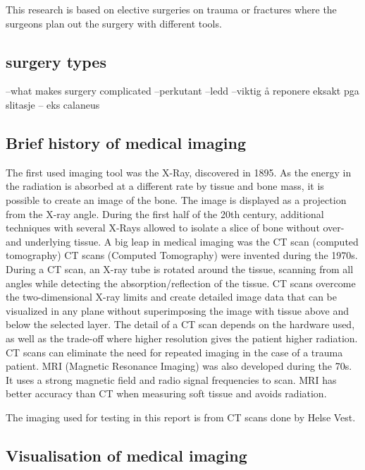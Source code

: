 \documentclass[a4paper]{report}
\begin{document}
This research is based on elective surgeries on trauma or fractures where the surgeons plan out the surgery with different tools.

\subsection{surgery types}
--what makes surgery complicated
--perkutant
--ledd
--viktig å reponere eksakt pga slitasje
-- eks calaneus

\subsection{Brief history of medical imaging}
The first used imaging tool was the X-Ray, discovered in 1895\cite{hamblen_outline_2010}\cite{suetens_fundamentals_2017}. As the energy in the radiation is absorbed at a different rate by tissue and bone mass, it is possible to create an image of the bone. The image is displayed as a projection from the X-ray angle. During the first half of the 20th century, additional techniques with several X-Rays allowed to isolate a slice of bone without over- and underlying tissue. A big leap in medical imaging was the CT scan (computed tomography)\cite{bradley_history_2008}
CT scans (Computed Tomography) were invented during the 1970s. During a CT scan, an X-ray tube is rotated around the tissue, scanning from all angles while detecting the absorption/reflection of the tissue. CT scans overcome the two-dimensional X-ray limits and create detailed image data that can be visualized in any plane without superimposing the image with tissue above and below the selected layer\cite{hamblen_outline_2010}. The detail of a CT scan depends on the hardware used, as well as the trade-off where higher resolution gives the patient higher radiation\cite{bradley_history_2008}. CT scans can eliminate the need for repeated imaging in the case of a trauma patient\cite{swiontkowski_manual_2013}.
MRI (Magnetic Resonance Imaging) was also developed during the 70s. It uses a strong magnetic field and radio signal frequencies to scan. MRI has better accuracy than CT when measuring soft tissue and avoids radiation.


The imaging used for testing in this report is from CT scans done by Helse Vest.

\subsection{Visualisation of medical imaging}
\end{document}
